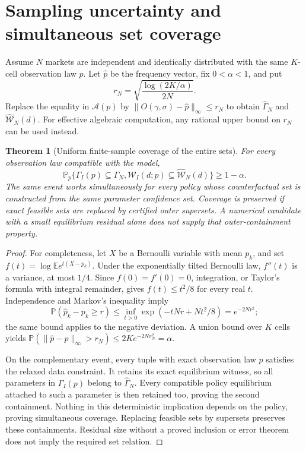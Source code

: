 \documentclass[11pt]{article}
\newtheorem{theorem}{Theorem}
\theoremstyle{remark}\newtheorem{remark}[theorem]{Remark}
\newcommand{\E}{\mathbb E}
\newcommand{\Prb}{\mathbb P}
\begin{document}
\section*{Sampling uncertainty and simultaneous set coverage}
Assume $N$ markets are independent and identically distributed with the same $K$-cell observation law $p$. Let $\widehat p$ be the frequency vector, fix $0<\alpha<1$, and put
\[
 r_N=\sqrt{\frac{\log(2K/\alpha)}{2N}}.
\]
Replace the equality in $\mathcal A(p)$ by
$\|O(\gamma,\sigma)-\widehat p\|_\infty\leq r_N$ to obtain $\widehat\Gamma_N$ and $\widehat{\mathcal W}_N(d)$. For effective algebraic computation, any rational upper bound on $r_N$ can be used instead.

\begin{theorem}[Uniform finite-sample coverage of the entire sets]\label{thm:coverage}
For every observation law compatible with the model,
\[
 \Prb_p\{\Gamma_I(p)\subseteq\widehat\Gamma_N,       \mathcal W_I(d;p)\subseteq\widehat{\mathcal W}_N(d)\}\geq1-\alpha. \tag{4}
\]
The same event works simultaneously for every policy whose counterfactual set is constructed from the same parameter confidence set. Coverage is preserved if exact feasible sets are replaced by certified outer supersets. A numerical candidate with a small equilibrium residual alone does not supply that outer-containment property.
\end{theorem}
\begin{proof}
For completeness, let $X$ be a Bernoulli variable with mean $p_k$, and set $f(t)=\log\E e^{t(X-p_k)}$. Under the exponentially tilted Bernoulli law, $f''(t)$ is a variance, at most $1/4$. Since $f(0)=f'(0)=0$, integration, or Taylor's formula with integral remainder, gives $f(t)\leq t^2/8$ for every real $t$. Independence and Markov's inequality imply
\[
 \Prb(\widehat p_k-p_k\geq r)
 \leq\inf_{t>0}\exp(-tNr+Nt^2/8)=e^{-2Nr^2};
\]
the same bound applies to the negative deviation. A union bound over $K$ cells yields
$\Prb(\|\widehat p-p\|_\infty>r_N)\leq2Ke^{-2Nr_N^2}=\alpha$.

On the complementary event, every tuple with exact observation law $p$ satisfies the relaxed data constraint. It retains its exact equilibrium witness, so all parameters in $\Gamma_I(p)$ belong to $\widehat\Gamma_N$. Every compatible policy equilibrium attached to such a parameter is then retained too, proving the second containment. Nothing in this deterministic implication depends on the policy, proving simultaneous coverage. Replacing feasible sets by supersets preserves these containments. Residual size without a proved inclusion or error theorem does not imply the required set relation.
\end{proof}
\end{document}
